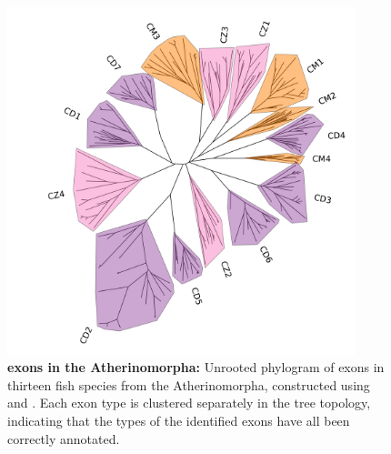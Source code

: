 \begin{figure}
\centering
\includegraphics[width=0.9\textwidth]{_Figures/png/ch-tree-all}
\caption[\ch exons in the Atherinomorpha]{\textbf{\ch exons in the Atherinomorpha:} Unrooted phylogram of \ch exons in thirteen fish species from the Atherinomorpha, constructed using  and . Each exon type is clustered separately in the tree topology, indicating that the types of the identified exons have all been correctly annotated.}
\label{fig:ch-tree-all}
\end{figure}

